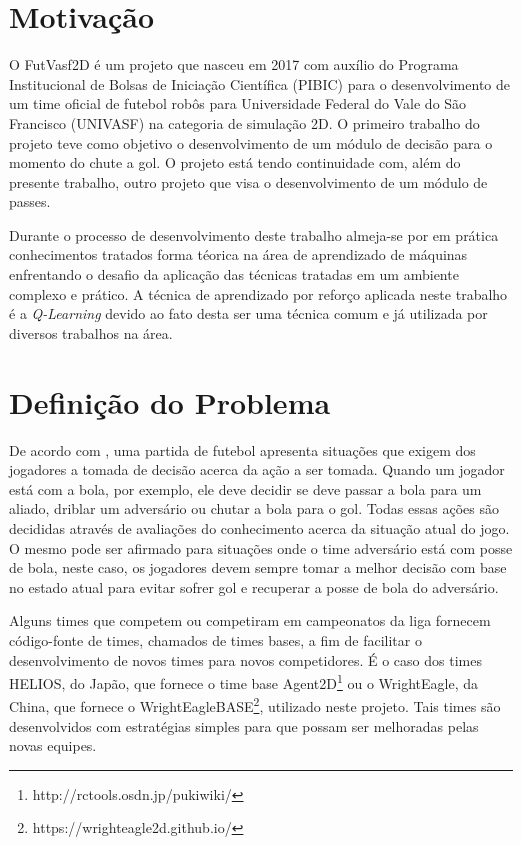 \section{Motivação}

O FutVasf2D é um projeto que nasceu em 2017 com auxílio do Programa Institucional de Bolsas de
Iniciação Científica (PIBIC) para o desenvolvimento de um time oficial de futebol robôs para
Universidade Federal do Vale do São Francisco (UNIVASF) na categoria de simulação 2D. O primeiro
trabalho do projeto teve como objetivo o desenvolvimento de um módulo de decisão para o momento do
chute a gol. O projeto está tendo continuidade com, além do presente trabalho, outro projeto que visa
o desenvolvimento de um módulo de passes.

Durante o processo de desenvolvimento deste trabalho almeja-se por em prática conhecimentos tratados
 forma téorica na área de aprendizado de máquinas enfrentando o desafio da aplicação das técnicas
 tratadas em um ambiente complexo e prático. A técnica de aprendizado por reforço aplicada neste
 trabalho é a \textit{Q-Learning} devido ao fato desta ser uma técnica comum e já utilizada por
 diversos trabalhos na área.

\section{Definição do Problema}

De acordo com , uma partida de futebol apresenta situações que exigem
dos jogadores a tomada de decisão acerca da ação a ser tomada. Quando um jogador está com a bola,
por exemplo, ele deve decidir se deve passar a bola para um aliado, driblar um adversário ou chutar
a bola para o gol. Todas essas ações são decididas através de avaliações do conhecimento acerca da
situação atual do jogo. O mesmo pode ser afirmado para situações onde o time adversário está com
posse de bola, neste caso, os jogadores devem sempre tomar a melhor decisão com base no estado atual
para evitar sofrer gol e recuperar a posse de bola do adversário.

Alguns times que competem ou competiram em campeonatos da liga fornecem código-fonte de times,
chamados de times bases, a fim de facilitar o desenvolvimento de novos times para novos competidores. É
o caso dos times HELIOS, do Japão, que fornece o time base Agent2D\footnote{http://rctools.osdn.jp/pukiwiki/} ou o WrightEagle, da China,
que fornece o WrightEagleBASE\footnote{https://wrighteagle2d.github.io/}, utilizado neste projeto. Tais times são desenvolvidos com estratégias
simples para que possam ser melhoradas pelas novas equipes.


